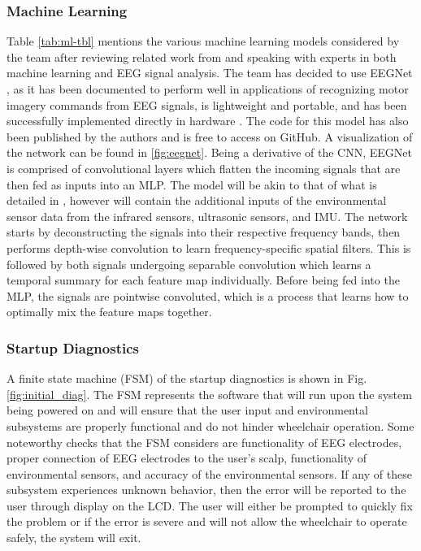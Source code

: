 \documentclass[conference]{IEEEtran}
\begin{document}
    \subsubsection{Machine Learning}
    Table \ref{tab:ml-tbl} mentions the various machine learning models considered by the team after reviewing related work from \cite{a_comprehensive_review, dmtl_bci, eegnet, eegnet_processor_design, lstm_eeg, robotic_architecture, toward_brain_computer, deep_learning_eeg} and speaking with experts in both machine learning and EEG signal analysis. The team has decided to use EEGNet \cite{eegnet}, as it has been documented to perform well in applications of recognizing motor imagery commands from EEG signals, is lightweight and portable, and has been successfully implemented directly in hardware \cite{deep_learning_eeg, eegnet_processor_design}. The code for this model has also been published by the authors and is free to access on GitHub. A visualization of the network can be found in \ref{fig:eegnet}. Being a derivative of the CNN, EEGNet is comprised of convolutional layers which flatten the incoming signals that are then fed as inputs into an MLP. The model will be akin to that of what is detailed in \cite{eegnet}, however will contain the additional inputs of the environmental sensor data from the infrared sensors, ultrasonic sensors, and IMU. The network starts by deconstructing the signals into their respective frequency bands, then performs depth-wise convolution to learn frequency-specific spatial filters. This is followed by both signals undergoing separable convolution which learns a temporal summary for each feature map individually. Before being fed into the MLP, the signals are pointwise convoluted, which is a process that learns how to optimally mix the feature maps together. 
    
    \subsubsection{Startup Diagnostics}
    A finite state machine (FSM) of the startup diagnostics is shown in Fig. \ref{fig:initial_diag}. The FSM represents the software that will run upon the system being powered on and will ensure that the user input and environmental subsystems are properly functional and do not hinder wheelchair operation. Some noteworthy checks that the FSM considers are functionality of EEG electrodes, proper connection of EEG electrodes to the user's scalp, functionality of environmental sensors, and accuracy of the environmental sensors. If any of these subsystem experiences unknown behavior, then the error will be reported to the user through display on the LCD. The user will either be prompted to quickly fix the problem or if the error is severe and will not allow the wheelchair to operate safely, the system will exit. 
\end{document}
